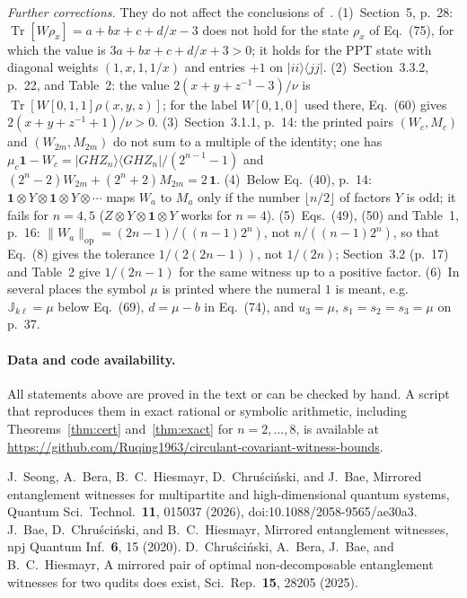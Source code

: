 \documentclass[10pt,a4paper]{article}
\newcommand{\ketbra}[2]{\lvert #1\rangle\langle #2\rvert}
\newcommand{\id}{\mathbf{1}}
\newcommand{\tr}{\operatorname{Tr}}
\newif\ifshowack \showackfalse
\begin{document}
\emph{Further corrections.} They do not affect the conclusions of~\cite{SBHCB26}.
(1)~Section~5, p.~28: $\tr[W\rho_x]=a+bx+c+d/x-3$ does not hold for the state $\rho_x$ of
Eq.~(75), for which the value is $3a+bx+c+d/x+3>0$; it holds for the PPT state with
diagonal weights $(1,x,1,1/x)$ and entries $+1$ on $\ketbra{ii}{jj}$.
(2)~Section~3.3.2, p.~22, and Table~2: the value $2(x+y+z^{-1}-3)/\nu$ is
$\tr[W[0,1,1]\rho(x,y,z)]$; for the label $W[0,1,0]$ used there, Eq.~(60) gives
$2(x+y+z^{-1}+1)/\nu>0$.
(3)~Section~3.1.1, p.~14: the printed pairs $(W_c,M_c)$ and $(W_{2m},M_{2m})$ do not sum
to a multiple of the identity; one has
$\mu_c\id-W_c=\ketbra{GHZ_n}{GHZ_n}/(2^{n-1}-1)$ and
$(2^n-2)W_{2m}+(2^n+2)M_{2m}=2\,\id$.
(4)~Below Eq.~(40), p.~14: $\id\otimes Y\otimes\id\otimes Y\otimes\cdots$ maps $W_a$ to
$M_a$ only if the number $\lfloor n/2\rfloor$ of factors $Y$ is odd; it fails for
$n=4,5$ ($Z\otimes Y\otimes\id\otimes Y$ works for $n=4$).
(5)~Eqs.~(49), (50) and Table~1, p.~16: $\|W_a\|_{\mathrm{op}}=(2n-1)/((n-1)2^n)$, not
$n/((n-1)2^n)$, so that Eq.~(8) gives the tolerance $1/(2(2n-1))$, not $1/(2n)$; Section~3.2
(p.~17) and Table~2 give $1/(2n-1)$ for the same witness up to a positive factor.
(6)~In several places the symbol $\mu$ is printed where the numeral $1$ is meant, e.g.\
$\mathbb{J}_{k\ell}=\mu$ below Eq.~(69), $d=\mu-b$ in Eq.~(74), and $u_3=\mu$,
$s_1=s_2=s_3=\mu$ on p.~37.

\paragraph{Data and code availability.} All statements above are proved in the text or
can be checked by hand. A script that reproduces them in exact rational or symbolic
arithmetic, including Theorems~\ref{thm:cert} and~\ref{thm:exact} for $n=2,\dots,8$, is
available at \url{https://github.com/Ruqing1963/circulant-covariant-witness-bounds}.

\ifshowack
\paragraph{AI disclosure statement.} Generative AI tools (Claude, Anthropic; Gemini, Google) were
used under the author's direction in drafting and typesetting the text, in cross-checking
algebra, and in writing the verification script. The author has checked all proofs and
computations and is solely responsible for the content.
\fi

\begin{thebibliography}{9}\small\setlength{\itemsep}{0pt}
 J.~Seong, A.~Bera, B.~C.~Hiesmayr, D.~Chru\'sci\'nski, and J.~Bae,
Mirrored entanglement witnesses for multipartite and high-dimensional quantum systems,
Quantum Sci.\ Technol.\ \textbf{11}, 015037 (2026), doi:10.1088/2058-9565/ae30a3.
\bibitem{BCH20} J.~Bae, D.~Chru\'sci\'nski, and B.~C.~Hiesmayr,
Mirrored entanglement witnesses, npj Quantum Inf.\ \textbf{6}, 15 (2020).
\bibitem{CBBH25} D.~Chru\'sci\'nski, A.~Bera, J.~Bae, and B.~C.~Hiesmayr,
A mirrored pair of optimal non-decomposable entanglement witnesses for two qudits does
exist, Sci.\ Rep.\ \textbf{15}, 28205 (2025).
\end{thebibliography}
\end{document}
